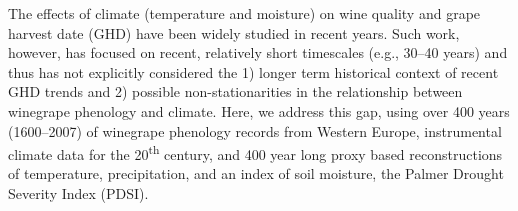 \documentclass[final]{nature}
\begin{document}
\indent The effects of climate (temperature\cite{coombe1987,jones2005} and moisture\cite{vanlee2009}) on wine quality and grape harvest date\cite{odo2012,webb2012} (GHD) have been widely studied in recent years. Such work, however, has focused on recent, relatively short timescales (e.g., 30--40 years\cite{Duchene:2005bd,tomasi2011,webb2012}) and thus has not explicitly considered the 1) longer term historical context of recent GHD trends and 2) possible non-stationarities in the relationship between winegrape phenology and climate. Here, we address this gap, using over 400 years (1600--2007) of winegrape phenology records from Western Europe\cite{Daux2012}, instrumental climate data for the 20\textsuperscript{th} century\cite{Harris2014}, and 400 year long proxy based reconstructions of temperature\cite{Luterbacher2004}, precipitation\cite{Pauling2006}, and an index of soil moisture, the Palmer Drought Severity Index\cite{CookOWDA2015} (PDSI).\\
\end{document}
